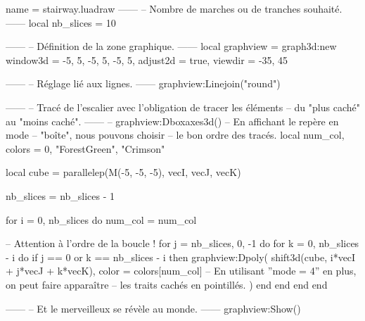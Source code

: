 \documentclass{standalone}
\begin{document}
\begin{luadraw}{name = stairway.luadraw}
------
-- Nombre de marches ou de tranches souhaité.
------
local nb_slices = 10

------
-- Définition de la zone graphique.
------
local graphview = graph3d:new{
  window3d = {-5, 5, -5, 5, -5, 5},
  adjust2d = true,
  viewdir  = {-35, 45}
}

------
-- Réglage lié aux lignes.
------
graphview:Linejoin("round")

------
-- Tracé de l'escalier avec l'obligation de tracer les éléments
-- du "plus caché" au "moins caché".
------
-- graphview:Dboxaxes3d()  -- En affichant le repère en mode
                        -- "boîte", nous pouvons choisir
                        -- le bon ordre des tracés.
local num_col, colors = 0, {"ForestGreen", "Crimson"}

local cube = parallelep(M(-5, -5, -5), vecI, vecJ, vecK)

nb_slices = nb_slices - 1

for i = 0, nb_slices do
  num_col = num_col%

-- Attention à l'ordre de la boucle !
  for j = nb_slices, 0, -1 do
    for k = 0, nb_slices - i do
      if j == 0 or k == nb_slices - i then
        graphview:Dpoly(
          shift3d(cube, i*vecI + j*vecJ + k*vecK),
          {
            color = colors[num_col]
-- En utilisant ''mode = 4'' en plus, on peut faire apparaître
-- les traits cachés en pointillés.
          })
      end
    end
  end
end

------
-- Et le merveilleux se révèle au monde.
------
graphview:Show()
\end{luadraw}
\end{document}
